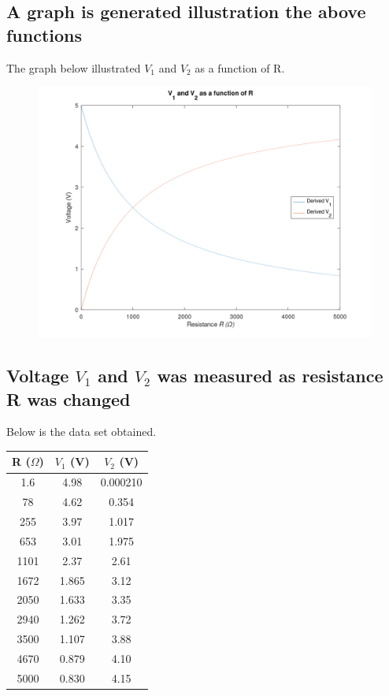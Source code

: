 \documentclass{article}
\begin{document}
\pagebreak

\subsection{A graph is generated illustration the above functions}
The graph below illustrated $V_1$ and $V_2$ as a function of R.
\begin{figure}[H]
\includegraphics[width = 345pt]{chart.png}
\end{figure}

\subsection{Voltage $V_1$ and $V_2$ was measured as resistance R was changed}
Below is the data set obtained.
\begin{center}
    \begin{tabular}{S[table-format=4.1] S[table-format=1.3] S[table-format=1.6]}
        \toprule
        {R ($\Omega$)} & {$V_1$ (V)} & {$V_2$ (V)}\\
         & 4.98 & 0.000210 \\
        78 & 4.62 & 0.354 \\
        255 & 3.97 & 1.017 \\
        653 & 3.01 & 1.975 \\
        1101 & 2.37 & 2.61 \\
        1672 & 1.865 & 3.12 \\
        2050 & 1.633 & 3.35 \\
        2940 & 1.262 & 3.72 \\
        3500 & 1.107 & 3.88 \\
        4670 & 0.879 & 4.10 \\
        5000 & 0.830 & 4.15 \\ 
        \bottomrule
    \end{tabular}
\end{center}
\end{document}
